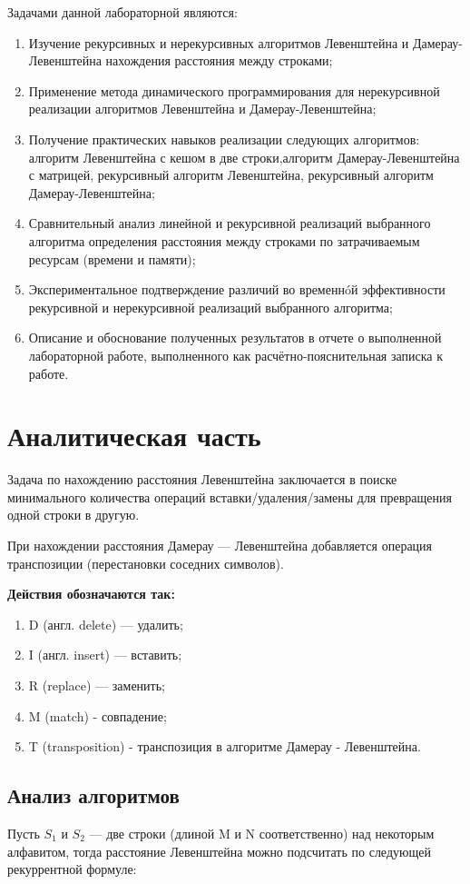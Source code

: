 \documentclass[12pt]{report}
\begin{document}
Задачами данной лабораторной являются:
\begin{enumerate}
  	\item Изучение рекурсивных и нерекурсивных алгоритмов Левенштейна и Дамерау-Левенштейна нахождения расстояния между строками;
	\item Применение метода динамического программирования для нерекурсивной реализации алгоритмов Левенштейна и Дамерау-Левенштейна; 
	\item Получение практических навыков реализации следующих алгоритмов: алгоритм Левенштейна с кешом в две строки,алгоритм Дамерау-Левенштейна с матрицей, рекурсивный алгоритм Левенштейна, рекурсивный алгоритм Дамерау-Левенштейна; 
	\item Сравнительный анализ линейной и рекурсивной реализаций выбранного алгоритма определения расстояния между строками по затрачиваемым ресурсам (времени и памяти); 
	\item Экспериментальное подтверждение различий во временнóй эффективности рекурсивной и
нерекурсивной реализаций выбранного алгоритма; 
	\item Описание и обоснование полученных результатов в отчете о выполненной лабораторной
работе, выполненного как расчётно-пояснительная записка к работе. 
\end{enumerate}


\chapter{Аналитическая часть}
Задача по нахождению расстояния Левенштейна заключается в поиске минимального количества операций вставки/удаления/замены для превращения одной строки в другую.

При нахождении расстояния Дамерау — Левенштейна добавляется операция транспозиции (перестановки соседних символов).  
 
\textbf{Действия обозначаются так:} 
\begin{enumerate}
  	\item D (англ. delete) — удалить;
	\item I (англ. insert) — вставить;
	\item R (replace) — заменить;
	\item M (match) - совпадение;
	\item T (transposition) - транспозиция в алгоритме Дамерау - Левенштейна.
\end{enumerate}
\section{Анализ алгоритмов}
Пусть $S_{1}$ и $S_{2}$ — две строки (длиной M и N соответственно) над некоторым алфавитом, тогда расстояние Левенштейна можно подсчитать по следующей рекуррентной формуле:
\end{document}
